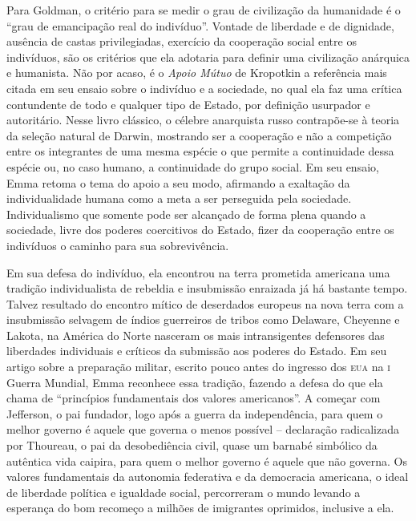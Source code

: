Para Goldman, o critério para se medir o grau de civilização da
humanidade é o “grau de emancipação real do indivíduo”. Vontade de
liberdade e de dignidade, ausência de castas privilegiadas, exercício
da cooperação social entre os indivíduos, são os critérios que ela
adotaria para definir uma civilização anárquica e humanista. Não por
acaso, é o \textit{Apoio Mútuo} de Kropotkin a referência mais citada em seu
ensaio sobre o indivíduo e a sociedade, no qual ela faz uma crítica
contundente de todo e qualquer tipo de Estado, por definição usurpador
e autoritário. Nesse livro clássico, o célebre anarquista russo
contrapõe-se à teoria da seleção natural de Darwin, mostrando ser a 
cooperação e não a competição entre os integrantes de uma mesma espécie
o que permite a continuidade dessa espécie ou, no caso humano, a
continuidade do grupo social. Em seu ensaio, Emma retoma o tema
do apoio a seu modo, afirmando a exaltação da individualidade humana como
a meta a ser perseguida pela sociedade. Individualismo que somente pode
ser alcançado de forma plena quando a sociedade, livre dos poderes
coercitivos do Estado, fizer da cooperação entre os indivíduos o
caminho para sua sobrevivência.

Em sua defesa do indivíduo, ela encontrou na terra prometida americana
uma tradição individualista de rebeldia e insubmissão enraizada já há
bastante tempo. Talvez resultado do encontro mítico de deserdados
europeus na nova terra com a insubmissão selvagem de índios guerreiros
de tribos como Delaware, Cheyenne e Lakota, na América do Norte
nasceram os mais intransigentes defensores das liberdades individuais e
críticos da submissão aos poderes do Estado. Em seu artigo sobre a
preparação militar, escrito pouco antes do ingresso dos \textsc{eua} na \textsc{i} Guerra
Mundial, Emma reconhece essa tradição, fazendo a defesa do que ela
chama de “princípios fundamentais dos valores americanos”. A começar
com Jefferson, o pai fundador, logo após a guerra da independência, 
para quem o melhor governo é aquele que governa o menos possível –
declaração radicalizada por Thoureau, o pai da desobediência civil, 
quase um barnabé simbólico da autêntica vida caipira, para quem o melhor
governo é aquele que não governa. Os valores fundamentais da autonomia
federativa e da democracia americana, o ideal de liberdade política e
igualdade social, percorreram o mundo levando a esperança do bom
recomeço a milhões de imigrantes oprimidos, inclusive a ela. 

